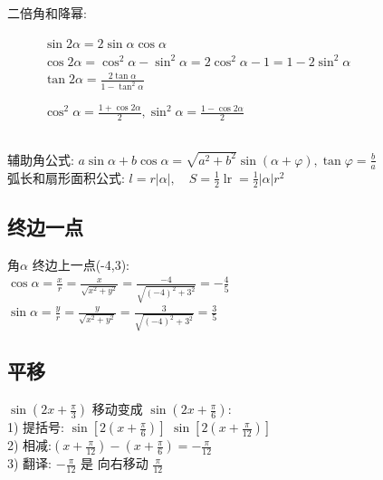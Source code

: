 \documentclass[hyperref, UTF8,11pt,a4paper]{ctexart} %
\begin{document}
\\
二倍角和降幂: 
\begin{figure}[!h] %
	\centering
	\begin{minipage}{270pt}
		$\sin 2 \alpha=2 \sin \alpha \cos \alpha$ \\
		$\cos 2 \alpha=\cos ^{2} \alpha-\sin ^{2} \alpha=2 \cos ^{2} \alpha-1=1-2 \sin ^{2} \alpha$ \\
		$\tan 2 \alpha=\frac{2 \tan \alpha}{1-\tan ^{2} \alpha}$
	\end{minipage}
	\hspace{10pt}
	\begin{minipage}{170pt}
		$\cos ^{2} \alpha=\frac{1+\cos 2 \alpha}{2}, \sin ^{2} \alpha=\frac{1-\cos 2 \alpha}{2}$
	\end{minipage}
\end{figure} 
\\
辅助角公式: \quad
$a \sin \alpha+b \cos \alpha=\sqrt{a^{2}+b^{2}} \sin (\alpha+\varphi), \tan \varphi=\frac{b}{a}$ \\
弧长和扇形面积公式: \quad
$l=r|\alpha|, \quad S=\frac{1}{2} \operatorname{lr}=\frac{1}{2}|\alpha| r^{2}$ \\
\newpage
\subsection{终边一点}
{\color{red} 角$\alpha$ 终边上一点(-4,3):} \\
$\cos \alpha=\frac{x}{r}=\frac{x}{\sqrt{x^{2}+y^{2}}}=\frac{-4}{\sqrt{(-4)^{2}+3^{2}}}=-\frac{4}{5}$ \\
$\sin \alpha=\frac{y}{r}=\frac{y}{\sqrt{x^{2}+y^{2}}}=\frac{3}{\sqrt{(-4)^{2}+3^{2}}}=\frac{3}{5}$


\subsection{平移}
{\color{red}  $\sin \left(2 x+\frac{\pi}{3}\right)$ 移动变成 $\sin \left(2 x+\frac{\pi}{6}\right)$:} \\
1) 提括号:	$\sin \left[2\left(x+\frac{\pi}{6}\right)\right]$ \quad $\sin \left[2\left(x+\frac{\pi}{12}\right)\right]$ \\
2) 相减:$\left(x+\frac{\pi}{12}\right)-\left(x+\frac{\pi}{6}\right)=-\frac{\pi}{12}$ \\
3) 翻译: $-\frac{\pi}{12}$ 是 向右移动 $\frac{\pi}{12}$
\end{document}
